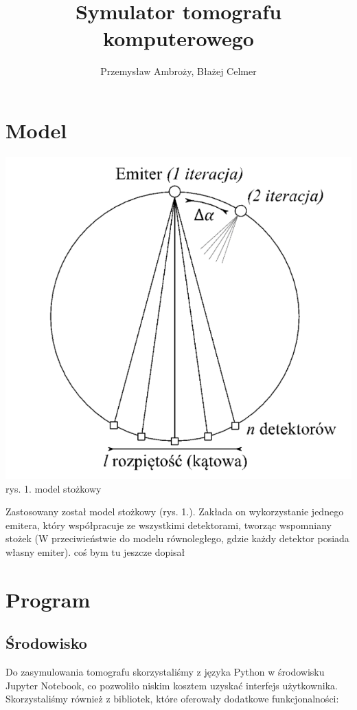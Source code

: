 \documentclass[polish,polish,a4paper]{article}
\title{Symulator tomografu komputerowego}
\author{Przemysław Ambroży, Błażej Celmer}
\begin{document}
 
	\maketitle
	
 	\section{Model}
		\begin{center}
			\includegraphics[scale=0.7]{img/model.png} \\
			\small{rys. 1. model stożkowy}
		\end{center}
		Zastosowany został model stożkowy (rys. 1.).
		 Zakłada on wykorzystanie jednego emitera,
		  który współpracuje ze wszystkimi detektorami, tworząc wspomniany stożek 
		  (W przeciwieństwie do modelu równoległego, gdzie każdy detektor posiada własny emiter).
		 {\color{red}  coś bym tu jeszcze dopisał }
		
	\section{Program}
		\subsection{Środowisko}
			Do zasymulowania tomografu skorzystaliśmy z języka Python w środowisku Jupyter Notebook,
			 co pozwoliło niskim kosztem uzyskać interfejs użytkownika.
			 Skorzystaliśmy również z bibliotek, które oferowały dodatkowe funkcjonalności:
			
\end{document}
